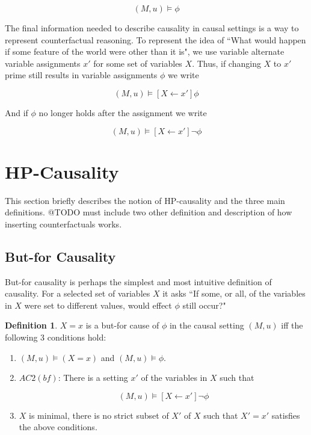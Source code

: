 \documentclass{article}
\theoremstyle{plain}
\theoremstyle{definition}
\newtheorem{defn}[thm]{Definition} %
\begin{document}
\[
(M,u) \models \phi
\]

The final information needed to describe causality in causal settings is a way to represent counterfactual reasoning. To represent the idea of ``What would happen if some feature of the world were other than it is", we use variable alternate variable assignments $x'$ for some set of variables $X$. Thus, if changing $X$ to $x'$ prime still results in variable assignments $\phi$ we write

\[
(M,u)\models [X\leftarrow x']\phi
\]

And if $\phi$ no longer holds after the assignment we write

\[
(M,u)\models [X\leftarrow x']\lnot \phi
\]

\section{HP-Causality}
This section briefly describes the notion of HP-causality and the three main definitions. @TODO must include two other definition and description of how inserting counterfactuals works.

\subsection{But-for Causality}

But-for causality is perhaps the simplest and most intuitive definition of causality. For a selected set of variables $X$ it asks ``If some, or all, of the variables in $X$ were set to different values, would effect $\phi$ still occur?"

\begin{defn}$X=x$ is a but-for cause of $\phi$ in the causal setting $(M,u)$ iff the following 3 conditions hold:
\begin{enumerate}
\item $(M,u) \models (X=x)$ and $(M,u) \models \phi$.
\item $AC2(bf)$: There is a setting $x'$ of the variables in $X$ such that

\[
(M,u) \models [X\leftarrow x']\lnot \phi
\] 

\item $X$ is minimal, there is no strict subset of $X'$ of $X$ such that $X' = x'$ satisfies the above conditions.
\end{enumerate}

\end{defn}
\end{document}
